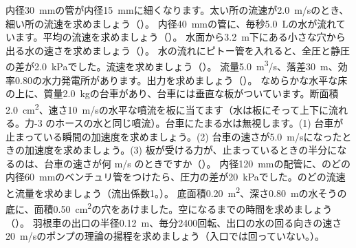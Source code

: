 
\bkendproblems
{}
\bkproblem 内径\qty{30}{mm}の管が内径\qty{15}{mm}に細くなります。太い所の流速が\qty{2.0}{m/s}のとき、細い所の流速を求めましょう（\nobreak{}\nobreak）。
\bkproblem 内径\qty{40}{mm}の管に、毎秒\qty{5.0}{L}の水が流れています。平均の流速を求めましょう（\nobreak{}\nobreak）。
\bkproblem 水面から\qty{3.2}{m}下にある小さな穴から出る水の速さを求めましょう（\nobreak{}\nobreak）。
\bkproblem 水の流れにピトー管を入れると、全圧と静圧の差が\qty{2.0}{kPa}でした。流速を求めましょう（\nobreak{}\nobreak）。
\bkproblem 流量\qty{5.0}{m^3/s}、落差\qty{30}{m}、効率0.80の水力発電所があります。出力を求めましょう（）。
\bkproblem なめらかな水平な床の上に、質量\qty{2.0}{kg}の台車があり、台車には垂直な板がついています。断面積\qty{2.0}{cm^2}、速さ\qty{10}{m/s}の水平な噴流を板に当てます（水は板にそって上下に流れる。力-3 のホースの水と同じ噴流）。台車にたまる水は無視します。(1) 台車が止まっている瞬間の加速度を求めましょう。(2) 台車の速さが\qty{5.0}{m/s}になったときの加速度を求めましょう。(3) 板が受ける力が、止まっているときの半分になるのは、台車の速さが何 m/s のときですか（\nobreak{}\nobreak）。
\bkproblem 内径\qty{120}{mm}の配管に、のどの内径\qty{60}{mm}のベンチュリ管をつけたら、圧力の差が\qty{20}{kPa}でした。のどの流速と流量を求めましょう（流出係数1。\nobreak）。
\bkproblem 底面積\qty{0.20}{m^2}、深さ\qty{0.80}{m}の水そうの底に、面積\qty{0.50}{cm^2}の穴をあけました。空になるまでの時間を求めましょう（\nobreak{}\nobreak）。
\bkproblem 羽根車の出口の半径\qty{0.12}{m}、毎分2400回転、出口の水の回る向きの速さ\qty{20}{m/s}のポンプの理論の揚程を求めましょう（入口では回っていない。\nobreak）。

